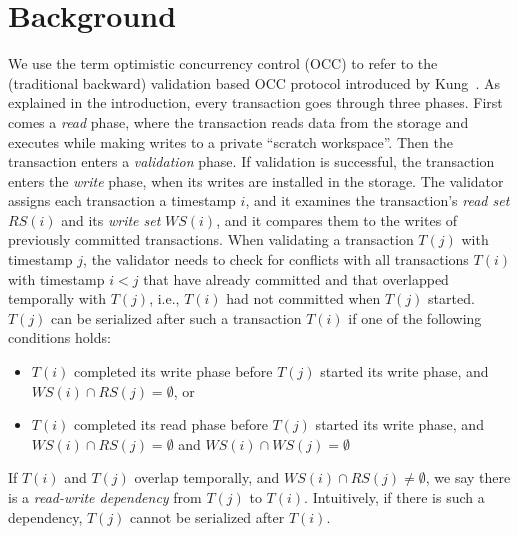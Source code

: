 \section{Background}\label{sec:background}

We use the term optimistic concurrency control (OCC) to refer to the (traditional backward) validation based OCC protocol introduced by Kung~\cite{kung81tods}.
As explained in the introduction, every transaction goes through three phases. First comes a \emph{read} phase, where the transaction reads data from the storage and executes while making writes to a private ``scratch workspace''. Then the transaction enters a \emph{validation} phase. If validation is successful, the transaction enters the \emph{write} phase, when its writes are installed in the storage. 
The validator assigns each transaction a timestamp $i$, and it examines the transaction's \emph{read set} $RS(i)$ and its \emph{write set} $WS(i)$, and it compares them to the writes of previously committed transactions. 
When validating a transaction $T(j)$ with timestamp $j$, the validator needs to check for conflicts with all transactions $T(i)$ with timestamp $i<j$ that have already committed and that overlapped temporally with $T(j)$, i.e., $T(i)$ had not committed when $T(j)$ started. 
$T(j)$ can be serialized after such a transaction $T(i)$ if one of the following conditions holds:
\begin{itemize}[leftmargin=*, nolistsep]
\item $T(i)$ completed its write phase before $T(j)$ started its write phase, and $WS(i) \cap RS(j) = \emptyset$, or
\item $T(i)$ completed its read phase before $T(j)$ started its write phase, and $WS(i) \cap RS(j) = \emptyset$ and $WS(i) \cap WS(j) = \emptyset$
\end{itemize}
If $T(i)$ and $T(j)$ overlap temporally, and $WS(i) \cap RS(j) \neq \emptyset$, we say there is a \emph{read-write dependency} from $T(j)$ to $T(i)$. Intuitively, if there is such a dependency, $T(j)$ cannot be serialized after $T(i)$. 

